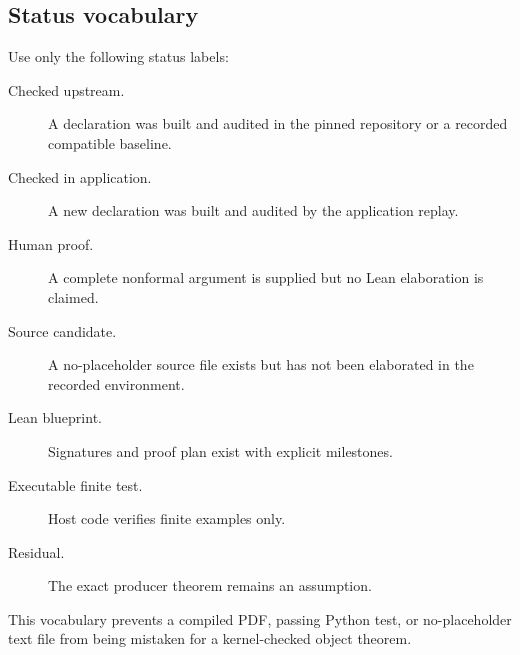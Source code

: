 \subsection{Status vocabulary}

Use only the following status labels:
\begin{description}
  \item[Checked upstream.] A declaration was built and audited in the pinned
  repository or a recorded compatible baseline.
  \item[Checked in application.] A new declaration was built and audited by
  the application replay.
  \item[Human proof.] A complete nonformal argument is supplied but no Lean
  elaboration is claimed.
  \item[Source candidate.] A no-placeholder source file exists but has not
  been elaborated in the recorded environment.
  \item[Lean blueprint.] Signatures and proof plan exist with explicit
  milestones.
  \item[Executable finite test.] Host code verifies finite examples only.
  \item[Residual.] The exact producer theorem remains an assumption.
\end{description}
This vocabulary prevents a compiled PDF, passing Python test, or no-placeholder
text file from being mistaken for a kernel-checked object theorem.
